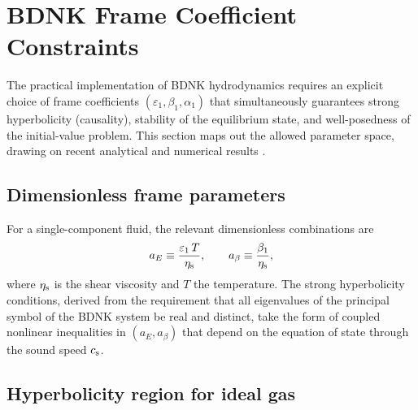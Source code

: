 \section{BDNK Frame Coefficient Constraints}
\label{sec:bdnk-parameter-space}

The practical implementation of BDNK hydrodynamics requires an explicit
choice of frame coefficients $(\varepsilon_1, \beta_1, \alpha_1)$ that
simultaneously guarantees strong hyperbolicity (causality), stability of
the equilibrium state, and well-posedness of the initial-value problem.
This section maps out the allowed parameter space, drawing on recent
analytical and numerical results
\citep{PandyaPretorius2021,PandyaMostPretorius2022ideal,HoultKovtun2022kinetic,BantilanIshiRomatschke2018}.

\subsection{Dimensionless frame parameters}
\label{sec:dimless-frame}

For a single-component fluid, the relevant dimensionless combinations
are
\begin{equation}
  a_E \equiv \frac{\varepsilon_1\, T}{\eta_{\mathrm{s}}},
  \qquad
  a_\beta \equiv \frac{\beta_1}{\eta_{\mathrm{s}}},
  \label{eq:dimless-frame-params}
\end{equation}
where $\eta_{\mathrm{s}}$ is the shear viscosity and $T$ the temperature.
The strong hyperbolicity conditions, derived from the requirement that
all eigenvalues of the principal symbol of the BDNK system be real and
distinct, take the form of coupled nonlinear inequalities in
$(a_E, a_\beta)$ that depend on the equation of state through the
sound speed $c_{\mathrm{s}}$.

\subsection{Hyperbolicity region for ideal gas}
\label{sec:hyper-ideal-gas}

